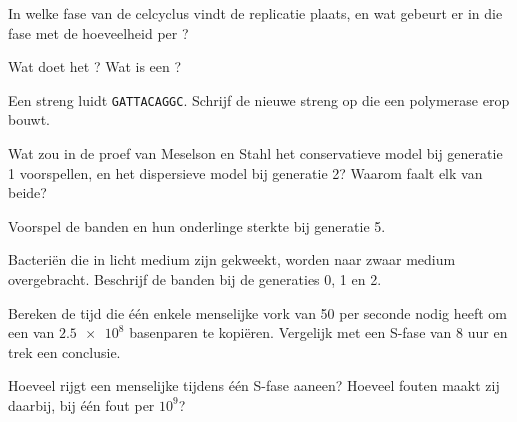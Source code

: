 \begin{exercise}[$\star$]\label{exo:g11:dna-replication:3}
In welke fase van de celcyclus vindt de replicatie plaats, en wat gebeurt
er in die fase met de hoeveelheid  per ?
\end{exercise}

\begin{exercise}[$\star$]\label{exo:g11:dna-replication:4}
Wat doet het ? Wat is een ?
\end{exercise}

\begin{exercise}[$\star$]\label{exo:g11:dna-replication:5}
Een streng luidt \texttt{GATTACAGGC}. Schrijf de nieuwe streng op die een
polymerase erop bouwt.
\end{exercise}

\begin{exercise}[$\star\star$]\label{exo:g11:dna-replication:6}
Wat zou in de proef van Meselson en Stahl het conservatieve model bij
generatie 1 voorspellen, en het dispersieve model bij generatie 2? Waarom
faalt elk van beide?
\end{exercise}

\begin{exercise}[$\star\star$]\label{exo:g11:dna-replication:7}
Voorspel de banden en hun onderlinge sterkte bij generatie 5.
\end{exercise}

\begin{exercise}[$\star\star$]\label{exo:g11:dna-replication:8}
Bacteriën die in licht medium zijn gekweekt, worden naar zwaar medium
overgebracht. Beschrijf de banden bij de generaties 0, 1 en 2.
\end{exercise}

\begin{exercise}[$\star\star$]\label{exo:g11:dna-replication:9}
Bereken de tijd die één enkele menselijke vork van 50
 per seconde nodig heeft om een  van $\num{2.5e8}$
basenparen te kopiëren. Vergelijk met een S-fase van 8 uur en trek een
conclusie.
\end{exercise}

\begin{exercise}[$\star\star$]\label{exo:g11:dna-replication:10}
Hoeveel  rijgt een menselijke  tijdens één S-fase aaneen?
Hoeveel fouten maakt zij daarbij, bij één fout per $10^9$?
\end{exercise}

